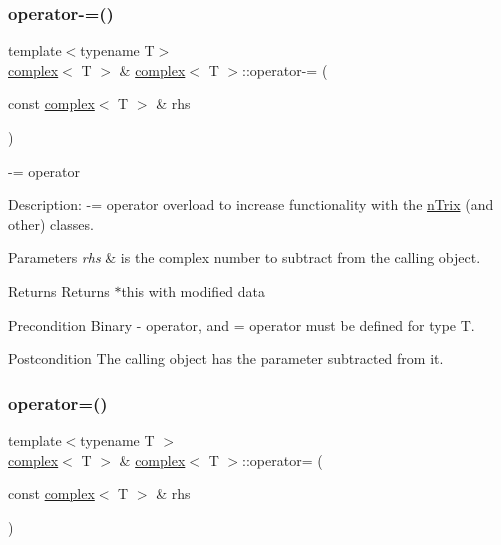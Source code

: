 \subsubsection{\texorpdfstring{operator-\/=()}{operator-=()}}
{\footnotesize\ttfamily template$<$typename T$>$ \\
\hyperlink{classcomplex}{complex}$<$ T $>$ \& \hyperlink{classcomplex}{complex}$<$ T $>$\+::operator-\/= (\begin{DoxyParamCaption}\item[{const \hyperlink{classcomplex}{complex}$<$ T $>$ \&}]{rhs }\end{DoxyParamCaption})}



-\/= operator 

Description\+: -\/= operator overload to increase functionality with the \hyperlink{classnTrix}{n\+Trix} (and other) classes. 
\begin{DoxyParams}{Parameters}
{\em rhs} & is the complex number to subtract from the calling object. \\
\hline
\end{DoxyParams}
\begin{DoxyReturn}{Returns}
Returns $\ast$this with modified data 
\end{DoxyReturn}
\begin{DoxyPrecond}{Precondition}
Binary -\/ operator, and = operator must be defined for type T. 
\end{DoxyPrecond}
\begin{DoxyPostcond}{Postcondition}
The calling object has the parameter subtracted from it. 
\end{DoxyPostcond}
\mbox{\label{classcomplex_a67d65378570f4b7a158b14a1502cc75f}} 
\subsubsection{\texorpdfstring{operator=()}{operator=()}\hspace{0.1cm}{\footnotesize\ttfamily [1/2]}}
{\footnotesize\ttfamily template$<$typename T $>$ \\
\hyperlink{classcomplex}{complex}$<$ T $>$ \& \hyperlink{classcomplex}{complex}$<$ T $>$\+::operator= (\begin{DoxyParamCaption}\item[{const \hyperlink{classcomplex}{complex}$<$ T $>$ \&}]{rhs }\end{DoxyParamCaption})}



